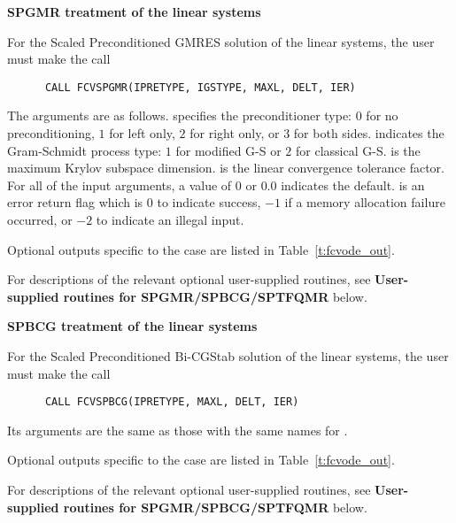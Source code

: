 \begin{Steps}
  
  {\bf SPGMR treatment of the linear systems}
  
  For the Scaled Preconditioned GMRES solution of the linear systems,
  the user must make the call
\begin{verbatim}
      CALL FCVSPGMR(IPRETYPE, IGSTYPE, MAXL, DELT, IER)
\end{verbatim}
  The arguments are as follows.
   specifies the preconditioner type: 
  $0$ for no preconditioning, $1$ for left only, $2$ for right only, or $3$ for
  both sides.  indicates the Gram-Schmidt process type: 
  $1$ for modified G-S or $2$ for classical G-S.
   is the maximum Krylov subspace dimension.
   is the linear convergence tolerance factor.
  For all of the input arguments, a value of $0$ or $0.0$ indicates the default.
   is an error return flag which is $0$ to indicate success, $-1$
  if a memory allocation failure occurred, or $-2$ to indicate an illegal input.
  
  Optional outputs specific to the {\spgmr} case are listed in
  Table~\ref{t:fcvode_out}.

  For descriptions of the relevant optional user-supplied routines, see 
  {\bf User-supplied routines for SPGMR/SPBCG/SPTFQMR} below.
  
  
  {\bf SPBCG treatment of the linear systems}
  
  For the Scaled Preconditioned Bi-CGStab solution of the linear systems,
  the user must make the call
\begin{verbatim}
      CALL FCVSPBCG(IPRETYPE, MAXL, DELT, IER)
\end{verbatim}
  Its arguments are the same as those with the same names for .

  Optional outputs specific to the {\spbcg} case are listed in
  Table~\ref{t:fcvode_out}.

  For descriptions of the relevant optional user-supplied routines, see 
  {\bf User-supplied routines for SPGMR/SPBCG/SPTFQMR} below.
  
  

\end{Steps}
